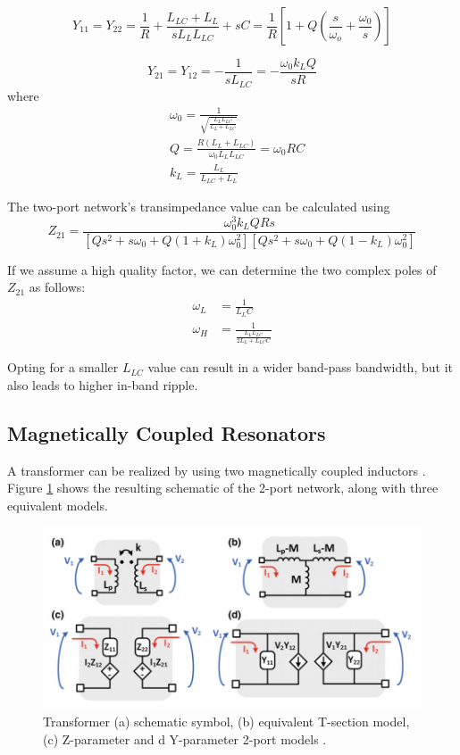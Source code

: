 \begin{equation}
    Y_{11}=Y_{22}=\frac{1}{R}+\frac{L_{LC}+L_L}{s L_L L_{LC}}+sC=\frac{1}{R}\left [1+Q\left (\frac{s}{\omega_o}+\frac{\omega_0}{s}\right )\right]
\end{equation}

\begin{equation}
    Y_{21}=Y_{12}=-\frac{1}{sL_{LC}}=-\frac{\omega_0k_LQ}{sR}
\end{equation}
where
\begin{align}
    &\omega_0=\frac{1}{\sqrt{\frac{L_L L_{LC}}{L_L+L_{LC}}}}\\
    &Q=\frac{R\left(L_L+L_{LC}\right )}{\omega_0 L_L L_{LC}}=\omega_0 RC\\
    &k_L=\frac{L_L}{L_{LC}+L_L}
\end{align}

The two-port network's transimpedance value can be calculated using
\begin{equation}
    Z_{21}=\frac{\omega_0^3k_LQRs}{\left [Qs^2+s\omega_0+Q\left (1+k_L\right )\omega_0^2\right ]\left [Qs^2+s\omega_0+Q\left (1-k_L\right )\omega_0^2\right]}
\end{equation}

If we assume a high quality factor, we can determine the two complex poles of $Z_{21}$ as follows:
\begin{align}
    \omega_L&=\frac{1}{L_LC}\\
    \omega_H&=\frac{1}{\frac{L_L L_{LC}}{2L_L+L_{LC}C}}
\end{align}

Opting for a smaller $L_{LC}$ value can result in a wider band-pass bandwidth, but it also leads to higher in-band ripple.

\subsection{Magnetically Coupled Resonators}
A transformer can be realized by using two magnetically coupled inductors \cite{868049}. Figure \ref{fig:transformer} shows the resulting schematic of the 2-port network, along with three equivalent models.

\begin{figure}[h]
    \centering
    \includegraphics[width=\textwidth]{figures/transformer.PNG}
    \caption{Transformer (a) schematic symbol, (b) equivalent T-section model, (c) Z-parameter and d Y-parameter 2-port models \cite{5G-and-E-band}.}
    \label{fig:transformer}
\end{figure}

